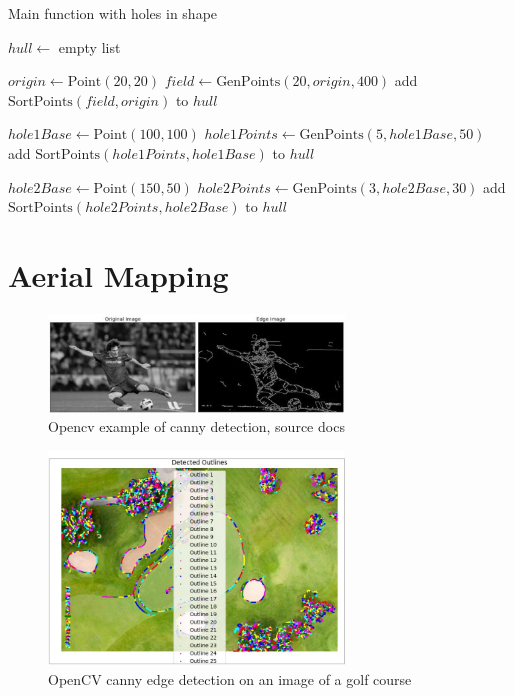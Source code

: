 \documentclass[final]{cmpreport_02}
\begin{document}
\begin{algorithm}[h!]
	\caption{Main function with holes in shape}
	\label{mg:mainWithHoles}
	\begin{algorithmic}[1]
		\State $hull \gets$ empty list

		\State $origin \gets \text{Point}(20, 20)$
		\State $field \gets \text{GenPoints}(20, origin, 400)$
		\State add $\text{SortPoints}(field, origin)$ to $hull$

		\State $hole1Base \gets \text{Point}(100, 100)$
		\State $hole1Points \gets \text{GenPoints}(5, hole1Base, 50)$
		\State add $\text{SortPoints}(hole1Points, hole1Base)$ to $hull$

		\State $hole2Base \gets \text{Point}(150, 50)$
		\State $hole2Points \gets \text{GenPoints}(3, hole2Base, 30)$
		\State add $\text{SortPoints}(hole2Points, hole2Base)$ to $hull$
		\EndProcedure
	\end{algorithmic}
\end{algorithm}


\clearpage
\section{Aerial Mapping}

\begin{figure}[h!]
	\centering
	\includegraphics[width=0.7\textwidth]{./images/openCvCannyExample.jpg}
	\caption{Opencv example of canny detection, source \citep{opencv_library} docs}
	\label{am:cannyexample}
\end{figure}


\begin{figure}[h!]
	\centering
	\includegraphics[width=0.7\textwidth]{./images/openCvCannyGolfCourse.png}
	\caption{OpenCV canny edge detection on an image of a golf course}
	\label{am:CannyGolfCourse}
\end{figure}
\end{document}
